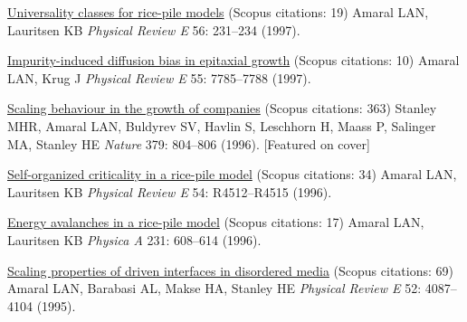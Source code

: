\NumberedItem{\makebox[0.8cm][r]{[12]}}
\href{/people/amaral/universality-classes-for-rice-pile-models}
{Universality classes for rice-pile models}
    (Scopus citations: 19)
\newline
Amaral LAN, Lauritsen KB
\newline
\textit{Physical Review E}
    56:
231--234 (1997).
\newline
\Gap
~
\Gap

\NumberedItem{\makebox[0.8cm][r]{[11]}}
\href{/people/amaral/impurity-induced-diffusion-bias-in-epitaxial-growth}
{Impurity-induced diffusion bias in epitaxial growth}
    (Scopus citations: 10)
\newline
Amaral LAN, Krug J
\newline
\textit{Physical Review E}
    55:
7785--7788 (1997).
\newline
\Gap
~
\Gap

\NumberedItem{\makebox[0.8cm][r]{[10]}}
\href{/people/amaral/scaling-behaviour-in-the-growth-of-companies}
{Scaling behaviour in the growth of companies}
    (Scopus citations: 363)
\newline
Stanley MHR, Amaral LAN, Buldyrev SV, Havlin S, Leschhorn H, Maass P, Salinger MA, Stanley HE
\newline
\textit{Nature}
    379:
804--806 (1996).
    [Featured on cover]
\newline
\Gap
~
\Gap

\NumberedItem{\makebox[0.8cm][r]{[9]}}
\href{/people/amaral/self-organized-critically-in-a-rice-pile-model}
{Self-organized criticality in a rice-pile model}
    (Scopus citations: 34)
\newline
Amaral LAN, Lauritsen KB
\newline
\textit{Physical Review E}
    54:
R4512--R4515 (1996).
\newline
\Gap
~
\Gap

\NumberedItem{\makebox[0.8cm][r]{[8]}}
\href{/people/amaral/energy-avalanches-in-a-rice-pile-model}
{Energy avalanches in a rice-pile model}
    (Scopus citations: 17)
\newline
Amaral LAN, Lauritsen KB
\newline
\textit{Physica A}
    231:
608--614 (1996).
\newline
\Gap
~
\Gap

\NumberedItem{\makebox[0.8cm][r]{[7]}}
\href{/people/amaral/scaling-properties-of-driven-interfaces-in-disordered-media}
{Scaling properties of driven interfaces in disordered media}
    (Scopus citations: 69)
\newline
Amaral LAN, Barabasi AL, Makse HA, Stanley HE
\newline
\textit{Physical Review E}
    52:
4087--4104 (1995).
\newline
\Gap
~
\Gap

